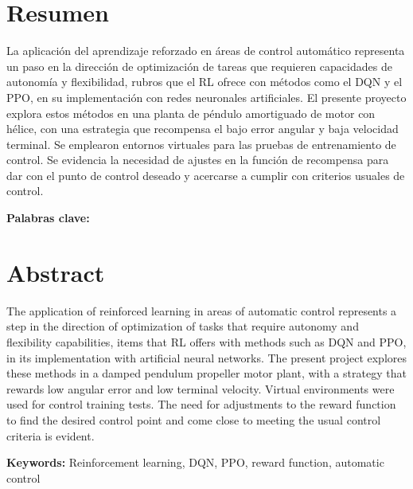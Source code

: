 \chapter*{Resumen}
\thispagestyle{empty}


La aplicación del aprendizaje reforzado en áreas de control automático representa un paso en la dirección de optimización de tareas que requieren capacidades de autonomía y flexibilidad, rubros que el RL ofrece con métodos como el DQN y el PPO, en su implementación con redes neuronales artificiales. El presente proyecto explora estos métodos en una planta de péndulo amortiguado de motor con hélice, con una estrategia que recompensa el bajo error angular y baja velocidad terminal. Se emplearon entornos virtuales para las pruebas de entrenamiento de control. Se evidencia la necesidad de ajustes en la función de recompensa para dar con el punto de control deseado y acercarse a cumplir con criterios usuales de control.


\bigskip

\textbf{Palabras clave:} \thesisKeywords

\clearpage
\chapter*{Abstract}
\thispagestyle{empty}

The application of reinforced learning in areas of automatic control represents a step in the direction of optimization of tasks that require autonomy and flexibility capabilities, items that RL offers with methods such as DQN and PPO, in its implementation with artificial neural networks. The present project explores these methods in a damped pendulum propeller motor plant, with a strategy that rewards low angular error and low terminal velocity. Virtual environments were used for control training tests. The need for adjustments to the reward function to find the desired control point and come close to meeting the usual control criteria is evident.

\bigskip

\textbf{Keywords:} Reinforcement learning, DQN, PPO, reward function, automatic control

\cleardoublepage

